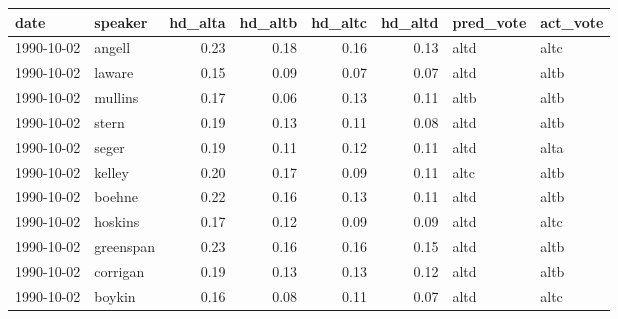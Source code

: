 \begin{tabular}{llrrrrll}
\toprule
       date &    speaker &  hd\_alta &  hd\_altb &  hd\_altc &  hd\_altd & pred\_vote & act\_vote \\
\midrule
 1990-10-02 &     angell &     0.23 &     0.18 &     0.16 &     0.13 &      altd &     altc \\
 1990-10-02 &     laware &     0.15 &     0.09 &     0.07 &     0.07 &      altd &     altb \\
 1990-10-02 &    mullins &     0.17 &     0.06 &     0.13 &     0.11 &      altb &     altb \\
 1990-10-02 &      stern &     0.19 &     0.13 &     0.11 &     0.08 &      altd &     altb \\
 1990-10-02 &      seger &     0.19 &     0.11 &     0.12 &     0.11 &      altd &     alta \\
 1990-10-02 &     kelley &     0.20 &     0.17 &     0.09 &     0.11 &      altc &     altb \\
 1990-10-02 &     boehne &     0.22 &     0.16 &     0.13 &     0.11 &      altd &     altb \\
 1990-10-02 &    hoskins &     0.17 &     0.12 &     0.09 &     0.09 &      altd &     altc \\
 1990-10-02 &  greenspan &     0.23 &     0.16 &     0.16 &     0.15 &      altd &     altb \\
 1990-10-02 &   corrigan &     0.19 &     0.13 &     0.13 &     0.12 &      altd &     altb \\
 1990-10-02 &     boykin &     0.16 &     0.08 &     0.11 &     0.07 &      altd &     altc \\
\bottomrule
\end{tabular}
